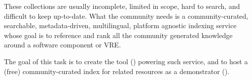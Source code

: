 \begin{workpackage}
\begin{tasklist}
\begin{task}[title=Demonstrator: Computational mathematics resources indexing service,
id=index-librorum-salvificorum,lead=UV,PM=2,partners={UB},wphases=20-25]
These collections are usually incomplete, limited in scope, hard to
search, and difficult to keep up-to-date.  What the community needs is a
community-curated, searchable, metadata-driven, multilingual, platform
agnostic indexing service whose goal is to reference and rank all the
community generated knowledge around a software component or VRE.

The goal of this task is to create the tool
() powering such service, and to host a
(free) community-curated index for \TheProject related resources as a
demonstrator ().

\end{task}




\end{tasklist}





\end{workpackage}
